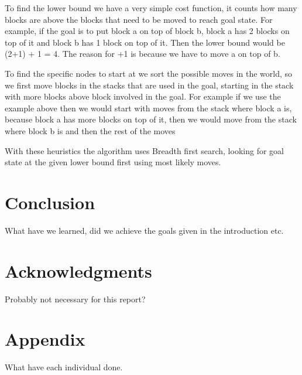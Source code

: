 \documentclass[11pt]{article}
\begin{document}
To find the lower bound we have a very simple cost function, it counts how many blocks are above the blocks that need to be moved to reach goal state. For example, if the goal is to put block a on top of block b, block a has 2 blocks on top of it and block b has 1 block on top of it. Then the lower bound would be (2+1) + 1 = 4. The reason for +1 is because we have to move a on top of b. 

To find the specific nodes to start at we sort the possible moves in the world, so we first move blocks in the stacks that are used in the goal, starting in the stack with more blocks above block involved in the goal. For example if we use the example above then we would  start with moves from the stack where block a is, because block a has more blocks on top of it, then we would move from the stack where block b is and then the rest of the moves

With these heuristics the algorithm uses Breadth first search, looking for goal state at the given lower bound first using most likely moves.

\section{Conclusion}
What have we learned, did we achieve the goals given in the introduction etc.

\section{Acknowledgments}
Probably not necessary for this report?




\section*{Appendix}
What have each individual done.
\end{document}
